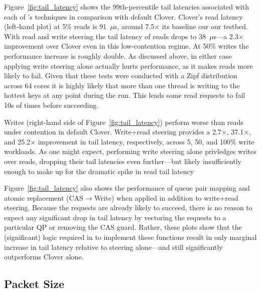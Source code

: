 Figure~\ref{fig:tail_latency} shows the 99th-percentile tail latencies
associated with each of \sword's techniques in comparison with default
Clover. Clover's read latency (left-hand plot) at 5\% reads is
91~$\mu$s, around 7.5$\times$ its baseline our our testbed. With read
and write steering the tail latency of reads drops to 38~$\mu$s---a
2.3$\times$ improvement over Clover even in this low-contention
regime. At 50\% writes the performance increase is roughly double.  As
discussed above, in either case applying write steering alone actually
hurts performance, as it makes reads more likely to fail.
Given that these tests were conducted with a
Zipf distribution across 64 cores it is highly likely that more than
one thread is writing to the hottest keys at any point during the
run. This leads some read requests to fail 10s of times before
succeeding.


Writes (right-hand side of Figure~\ref{fig:tail_latency}) perform
worse than reads under contention in default Clover. Write+read
steering provides a 2.7$\times$, 37.1$\times$, and 25.2$\times$
improvement in tail latency, respectively, across 5, 50, and 100\%
write workloads.  As one might expect, performing write steering alone
privledges writes over reads, dropping their tail latencies even
further---but likely insufficiently enough to make up for the dramatic
spike in read tail latency

Figure~\ref{fig:tail_latency} also shows the performance of queue pair
mapping and atomic replacement (CAS$\rightarrow$Write) when applied in addition
to write+read steering.  Because the requests are already likely to
succeed, there is no reason to expect any significant drop in tail
latency by vectoring the requests to a particular QP or removing the
CAS guard.  Rather, these plots show that the (significant) 
logic required in {\sword} to implement these functions result in only
marginal increase in tail latency relative to steering alone---and still
significantly outperforms Clover alone.

\subsection{Packet Size}

